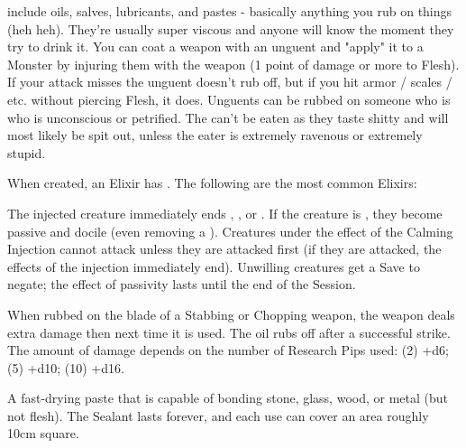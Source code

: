  include oils, salves, lubricants, and pastes - basically anything you rub on things (heh heh).  They're usually super viscous and anyone will know the moment they try to drink it.  You can coat a weapon with an unguent  and "apply" it to a Monster by injuring them with the weapon (1 point of damage or more to Flesh).  If your attack misses the unguent doesn't rub off, but if you hit armor / scales / etc. without piercing Flesh, it does.  Unguents can be rubbed on someone who is who is unconscious or petrified.  The can’t be eaten as they taste shitty and will most likely be spit out, unless the eater is extremely ravenous or extremely stupid.


When created, an Elixir has . The following are the most common Elixirs:

\newpage 

\CHYMISTRY[
    Name=Al-Farabi's Calming Injection,
    Link=chymistry-al-farabis-calming-injection,
    Type=Sera,
    Pips=5,
    Time=Weeks
]

  The injected creature immediately ends , , or . If the creature is , they become passive and docile (even removing a ).  Creatures under the effect of the Calming Injection cannot attack unless they are attacked first (if they are attacked, the effects of the injection immediately end). Unwilling creatures get a Save to negate; the effect of passivity lasts until the end of the Session.

  \CHYMISTRY[
    Name=Boyle's Sharpening Paste,
    Link=chymistry-boyles-sharpening-paste,
    Type=Unguent,
    Pips=2+,
    Time=Days
  ]

  When rubbed on the blade of a Stabbing or Chopping weapon, the weapon deals extra damage then next time it is used. The oil rubs off after a successful strike. The amount of damage depends on the number of Research Pips used:  (2) +d6; (5) +d10; (10) +d16.  


  \CHYMISTRY[
    Name=Brahe's Efficacious Sealant,
    Link=chymistry-brahes-efficacious-sealant,
    Type=Unguent,
    Pips=5,
    Time=Weeks
  ]


  A fast-drying paste that is capable of bonding stone, glass, wood, or metal (but not flesh). The Sealant lasts forever, and each use can cover an area roughly 10cm square.


\CHYMISTRY[
    Name=Chyme's Nerve Tonic,
    Link=chymistry-chymes-nerve-tonic,
    Type=Tonic,
    Pips=2+,
    Time=Days
]

